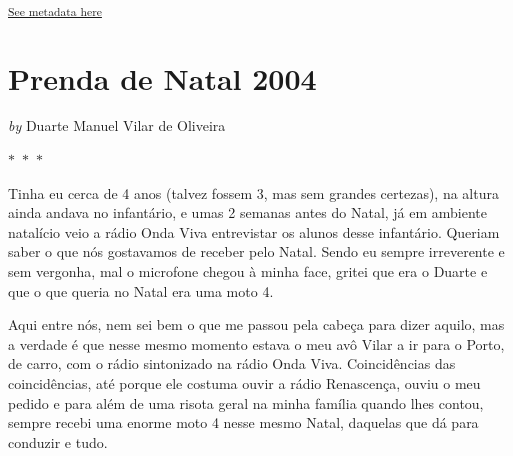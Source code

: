 \documentclass{article}
\begin{document}
    
        \textsuperscript{\hyperref[table:\arabic{tablecounter}]{See metadata here}}
    


\newpage
\section{Prenda de Natal 2004}


    
        \textit{by} Duarte Manuel Vilar de Oliveira
    


 
    

    $\ast$~$\ast$~$\ast$  


    \begin{center}
        \begin{minipage}{0.9\textwidth}
            \setlength{\parskip}{0.2cm}
            \setlength{\parindent}{0cm}
            \fontsize{12pt}{14pt}\selectfont
            


Tinha eu cerca de 4 anos (talvez fossem 3, mas sem grandes certezas), na
altura ainda andava no infantário, e umas 2 semanas antes do Natal, já
em ambiente natalício veio a rádio Onda Viva entrevistar os alunos desse
infantário. Queriam saber o que nós gostavamos de receber pelo Natal.
Sendo eu sempre irreverente e sem vergonha, mal o microfone chegou à
minha face, gritei que era o Duarte e que o que queria no Natal era uma
moto 4.

Aqui entre nós, nem sei bem o que me passou pela cabeça para
dizer aquilo, mas a verdade é que nesse mesmo momento estava o meu avô
Vilar a ir para o Porto, de carro, com o rádio sintonizado na rádio Onda
Viva. Coincidências das coincidências, até porque ele costuma ouvir a
rádio Renascença, ouviu o meu pedido e para além de uma risota geral na
minha família quando lhes contou, sempre recebi uma enorme moto 4 nesse
mesmo Natal, daquelas que dá para conduzir e tudo.

        \end{minipage}
    \end{center}
\end{document}

